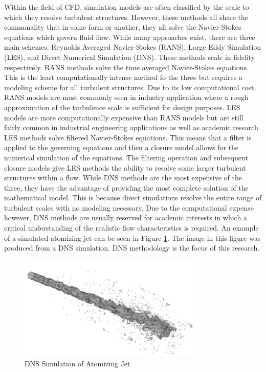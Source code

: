 Within the field of CFD, simulation models are often classified by the scale to which they resolve turbulent structures. However, these methods all share the commonality that in some form or another, they all solve the Navier-Stokes equations which govern fluid flow. While many approaches exist, there are three main schemes: Reynolds Averaged Navier-Stokes (RANS), Large Eddy Simulation (LES), and Direct Numerical Simulation (DNS). These methods scale in fidelity respectively. RANS methods solve the time averaged Navier-Stokes equations. This is the least computationally intense method fo the three but requires a modeling scheme for all turbulent structures. Due to its low computational cost, RANS models are most commonly seen in industry application where a rough approximation of the turbulence scale is sufficient for design purposes. LES models are more computationally expensive than RANS models but are still fairly common in industrial engineering applications as well as academic research. LES methods solve filtered Navier-Stokes equations. This means that a filter is applied to the governing equations and then a closure model allows for the numerical simulation of the equations. The filtering operation and subsequent closure models give LES methods the ability to resolve some larger turbulent structures within a flow. While DNS methods are the most expensive of the three, they have the advantage of providing the most complete solution of the mathematical model. This is because direct simulations resolve the entire range of turbulent scales with no modeling necessary. Due to the computational expense however, DNS methods are usually reserved for academic interests in which a critical understanding of the realistic flow characteristics is required. An example of a simulated atomizing jet can be seen in Figure \ref{fig:DNSjet}. The image in this figure was produced from a DNS simulation. DNS methodology is the focus of this research. 

\begin{figure}[htbp]
	\centering
	\includegraphics[width=0.8\textwidth]{figs/ACESjet}
	\caption{DNS Simulation of Atomizing Jet}
	\label{fig:DNSjet}
\end{figure}

